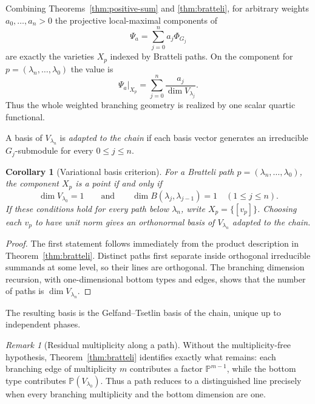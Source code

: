 \documentclass[10pt]{amsart}
\newtheorem{corollary}[theorem]{Corollary}
\theoremstyle{remark}
\newtheorem{remark}[theorem]{Remark}
\newcommand{\PP}{\mathbb P}
\begin{document}
Combining Theorems~\ref{thm:positive-sum} and \ref{thm:bratteli}, for arbitrary weights
$a_0,\ldots,a_n>0$ the projective local-maximal components of
\[
 \Psi_a=\sum_{j=0}^n a_j\Phi_{G_j}
\]
are exactly the varieties $X_p$ indexed by Bratteli paths. On the component for
$p=(\lambda_n,\ldots,\lambda_0)$ the value is
\begin{equation}\label{eq:path-sum-height}
 \Psi_a|_{X_p}=\sum_{j=0}^n\frac{a_j}{\dim V_{\lambda_j}}.
\end{equation}
Thus the whole weighted branching geometry is realized by one scalar quartic functional.

A basis of $V_{\lambda_n}$ is \emph{adapted to the chain}
if each basis vector generates an irreducible
$G_j$-submodule for every $0\leq j\leq n$.

\begin{corollary}[Variational basis criterion]\label{cor:bratteli-mf}
For a Bratteli path $p=(\lambda_n,\ldots,\lambda_0)$,
the component $X_p$ is a point if and only if
\[
 \dim V_{\lambda_0}=1
 \qquad\text{and}\qquad
 \dim B(\lambda_j,\lambda_{j-1})=1
 \quad (1\leq j\leq n).
\]
If these conditions hold for every path below $\lambda_n$,
write $X_p=\{[v_p]\}$.
Choosing each $v_p$ to have unit norm gives an
orthonormal basis of $V_{\lambda_n}$ adapted to the chain.
\end{corollary}

\begin{proof}
The first statement follows immediately from the product description in
Theorem~\ref{thm:bratteli}. Distinct paths first separate inside orthogonal irreducible summands at some
level, so their lines are orthogonal. The branching dimension recursion, with one-dimensional bottom
types and edges, shows that the number of paths is $\dim V_{\lambda_n}$.
\end{proof}

The resulting basis is the Gelfand--Tsetlin basis
of the chain, unique up to independent phases.

\begin{remark}[Residual multiplicity along a path]\label{rem:path-multiplicity}
Without the multiplicity-free hypothesis, Theorem~\ref{thm:bratteli} identifies exactly what remains:
each branching edge of multiplicity $m$ contributes a factor $\PP^{m-1}$, while the bottom type contributes
$\PP(V_{\lambda_0})$. Thus a path reduces to a distinguished line precisely when every branching
multiplicity and the bottom dimension are one.
\end{remark}
\end{document}
